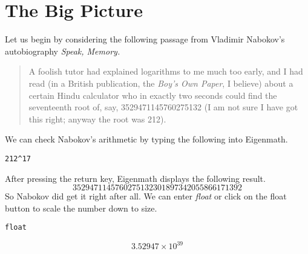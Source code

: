 \chapter{The Big Picture}
Let us begin by considering the following passage from Vladimir Nabokov's
autobiography {\it Speak, Memory.}
\begin{quote}
A foolish tutor had explained logarithms to me much too early, and I had
read (in a British publication, the {\it Boy's Own Paper}, I believe)
about a certain Hindu calculator who in exactly two seconds could find the
seventeenth root of, say,
3529471145760275132
(I am not sure I have got this right; anyway the root was 212).
\end{quote}
We can check Nabokov's arithmetic by typing the following into Eigenmath.

\medskip
\verb$212^17$

\medskip
\noindent
After pressing the return key, Eigenmath displays the following result.
$$3529471145760275132301897342055866171392$$
So Nabokov did get it right after all.
We can enter {\it float} or click on the float button to scale the number
down to size.

\medskip
\verb$float$

$$3.52947\times10^{39}$$

